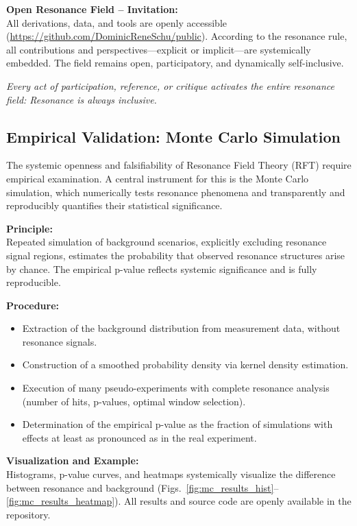 \documentclass[12pt]{iopart}
\begin{document}
\noindent\textbf{Open Resonance Field – Invitation:}\\
All derivations, data, and tools are openly accessible (\url{https://github.com/DominicReneSchu/public}). According to the resonance rule, all contributions and perspectives—explicit or implicit—are systemically embedded. The field remains open, participatory, and dynamically self-inclusive.

\medskip

\noindent\textit{Every act of participation, reference, or critique activates the entire resonance field: Resonance is always inclusive.}

\subsection{Empirical Validation: Monte Carlo Simulation}
\label{sec:monte_carlo}

The systemic openness and falsifiability of Resonance Field Theory (RFT) require empirical examination. A central instrument for this is the Monte Carlo simulation, which numerically tests resonance phenomena and transparently and reproducibly quantifies their statistical significance.

\textbf{Principle:}\\
Repeated simulation of background scenarios, explicitly excluding resonance signal regions, estimates the probability that observed resonance structures arise by chance. The empirical p-value reflects systemic significance and is fully reproducible.

\textbf{Procedure:}
\begin{itemize}
	\item Extraction of the background distribution from measurement data, without resonance signals.
	\item Construction of a smoothed probability density via kernel density estimation.
	\item Execution of many pseudo-experiments with complete resonance analysis (number of hits, p-values, optimal window selection).
	\item Determination of the empirical p-value as the fraction of simulations with effects at least as pronounced as in the real experiment.
\end{itemize}

\textbf{Visualization and Example:}\\
Histograms, p-value curves, and heatmaps systemically visualize the difference between resonance and background (Figs.~\ref{fig:mc_results_hist}–\ref{fig:mc_results_heatmap}). All results and source code are openly available in the repository.
\end{document}
